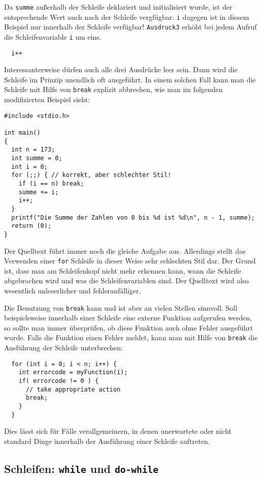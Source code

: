 Da \verb|summe| außerhalb der Schleife deklariert und initialisiert wurde, ist der entsprechende Wert auch nach der Schleife vergfügbar.
\verb|i| dagegen ist in diesem Beispiel nur innerhalb der Schleife verfügbar!
\texttt{Ausdruck3} erhöht bei jedem Aufruf die Schleifenvariable \verb|i| um eins.
\begin{lstlisting}
  i++
\end{lstlisting}
Interessanterweise dürfen auch alle drei Ausdrücke leer sein.
Dann wird die Schleife im Prinzip unendlich oft ausgeführt.
In einem solchen Fall kann man die Schleife mit Hilfe von \verb|break| explizit abbrechen, wie man im folgenden modifizierten Beispiel sieht:
\begin{lstlisting}
#include <stdio.h>

int main()
{
  int n = 173;
  int summe = 0;
  int i = 0;
  for (;;) { // korrekt, aber schlechter Stil!
    if (i == n) break;
    summe += i;
    i++;
  }
  printf("Die Summe der Zahlen von 0 bis %d ist %d\n", n - 1, summe);
  return (0);
}
\end{lstlisting}
Der Quelltext führt immer noch die gleiche Aufgabe aus. 
Allerdings stellt das Verwenden einer \texttt{for} Schleife in dieser Weise sehr schlechten Stil dar.
Der Grund ist, dass man am Schleifenkopf nicht mehr erkennen kann, wann die Schleife abgebrochen wird und was die Schleifenvariablen sind.
Der Quelltext wird also wesentlich unleserlicher und fehleranfälliger.

Die Benutzung von \verb|break| kann und ist aber an vielen Stellen sinnvoll.
Soll beispielsweise innerhalb einer Schleife eine externe Funktion aufgerufen werden, so sollte man immer überprüfen, ob diese Funktion auch ohne Fehler ausgeführt wurde.
Falls die Funktion einen Fehler meldet, kann man mit Hilfe von \verb|break| die Ausführung der Schleife unterbrechen:
\begin{lstlisting}
  for (int i = 0; i < n; i++) {
    int errorcode = myFunction(i);
    if( errorcode != 0 ) {
      // take appropriate action
      break;
    }
  }
\end{lstlisting}
Dies lässt sich für Fälle verallgemeinern, in denen unerwartete oder nicht standard Dinge innerhalb der Ausführung einer Schleife auftreten.

\subsection{Schleifen: \texttt{while} und \texttt{do-while}}

